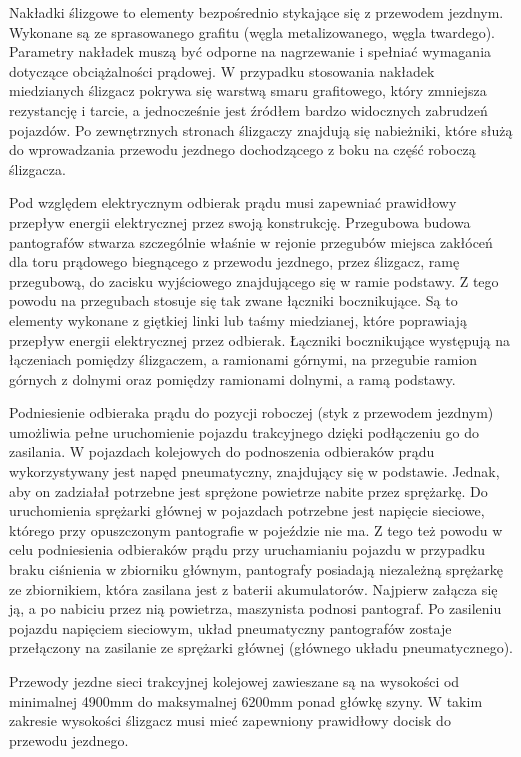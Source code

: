 Nakładki ślizgowe to elementy bezpośrednio stykające się z przewodem jezdnym. Wykonane są ze sprasowanego grafitu (węgla metalizowanego, węgla twardego). Parametry nakładek muszą być odporne na nagrzewanie i spełniać wymagania dotyczące obciążalności prądowej. W przypadku stosowania nakładek miedzianych ślizgacz pokrywa się warstwą smaru grafitowego, który zmniejsza rezystancję i tarcie, a jednocześnie jest źródłem bardzo widocznych zabrudzeń pojazdów. 
Po zewnętrznych stronach ślizgaczy znajdują się nabieżniki, które służą do wprowadzania przewodu jezdnego dochodzącego z boku na część roboczą ślizgacza. 

Pod względem elektrycznym odbierak prądu musi zapewniać prawidłowy przepływ energii elektrycznej przez swoją konstrukcję. Przegubowa budowa pantografów stwarza szczególnie właśnie w rejonie przegubów miejsca zakłóceń dla toru prądowego biegnącego z przewodu jezdnego, przez ślizgacz, ramę przegubową, do zacisku wyjściowego znajdującego się w ramie podstawy. Z tego powodu na przegubach stosuje się tak zwane łączniki bocznikujące. Są to elementy wykonane z giętkiej linki lub taśmy miedzianej, które poprawiają przepływ energii elektrycznej przez odbierak. Łączniki bocznikujące występują na łączeniach pomiędzy ślizgaczem, a ramionami górnymi, na przegubie ramion górnych z dolnymi oraz pomiędzy ramionami dolnymi, a ramą podstawy. 

Podniesienie odbieraka prądu do pozycji roboczej (styk z przewodem jezdnym) umożliwia pełne uruchomienie pojazdu trakcyjnego dzięki podłączeniu go do zasilania. W pojazdach kolejowych do podnoszenia odbieraków prądu wykorzystywany jest napęd pneumatyczny, znajdujący się w podstawie. Jednak, aby on zadziałał potrzebne jest sprężone powietrze nabite przez sprężarkę. Do uruchomienia sprężarki głównej w pojazdach potrzebne jest napięcie sieciowe, którego przy opuszczonym pantografie w pojeździe nie ma. Z tego też powodu w celu podniesienia odbieraków prądu przy uruchamianiu pojazdu w przypadku braku ciśnienia w zbiorniku głównym, pantografy posiadają niezależną sprężarkę ze zbiornikiem, która zasilana jest z baterii akumulatorów. Najpierw załącza się ją, a po nabiciu przez nią powietrza, maszynista podnosi pantograf. Po zasileniu pojazdu napięciem sieciowym, układ pneumatyczny pantografów zostaje przełączony na zasilanie ze sprężarki głównej (głównego układu pneumatycznego). 

Przewody jezdne sieci trakcyjnej kolejowej zawieszane są na wysokości od minimalnej 4900mm do maksymalnej 6200mm ponad główkę szyny. W takim zakresie wysokości ślizgacz musi mieć zapewniony prawidłowy docisk do przewodu jezdnego.

